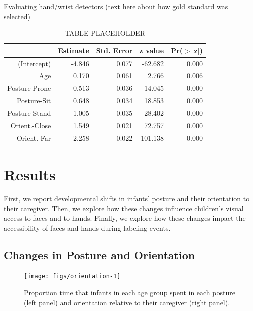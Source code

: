 \documentclass[10pt, letterpaper]{article}
\newenvironment{CodeChunk}{}{}
\begin{document}
Evaluating hand/wrist detectors (text here about how gold standard was
selected)

\begin{table}[H]
\centering
\begin{tabular}{rrrrr}
  \hline
 & Estimate & Std. Error & z value & Pr($>$$|$z$|$) \\ 
  \hline
(Intercept) & -4.846 & 0.077 & -62.682 & 0.000 \\ 
  Age & 0.170 & 0.061 & 2.766 & 0.006 \\ 
  Posture-Prone & -0.513 & 0.036 & -14.045 & 0.000 \\ 
  Posture-Sit & 0.648 & 0.034 & 18.853 & 0.000 \\ 
  Posture-Stand & 1.005 & 0.035 & 28.402 & 0.000 \\ 
  Orient.-Close & 1.549 & 0.021 & 72.757 & 0.000 \\ 
  Orient.-Far & 2.258 & 0.022 & 101.138 & 0.000 \\ 
   \hline
\end{tabular}
\caption{TABLE PLACEHOLDER} 
\end{table}

\section{Results}\label{results}

First, we report developmental shifts in infants' posture and their
orientation to their caregiver. Then, we explore how these changes
influence children's visual access to faces and to hands. Finally, we
explore how these changes impact the accessibility of faces and hands
during labeling events.

\subsection{Changes in Posture and
Orientation}\label{changes-in-posture-and-orientation}

\begin{CodeChunk}
\begin{figure}[h]

{\centering \texttt{[image: figs/orientation-1]} 

}

\caption[Proportion time that infants in each age group spent in each posture (left panel) and orientation relative to their caregiver (right  panel)]{Proportion time that infants in each age group spent in each posture (left panel) and orientation relative to their caregiver (right  panel).}\label{fig:orientation}
\end{figure}
\end{CodeChunk}
\end{document}
